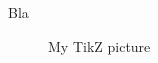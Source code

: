 \documentclass[a4paper,11pt]{article}
\begin{document}


\tableofcontents

\newpage




Bla

\begin{figure}
  \caption{My TikZ picture}
  \label{fig:tikz:particule1}
\end{figure}

\newpage

\cite{ref:FT_graph}


\end{document}
